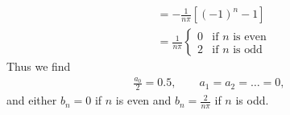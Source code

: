 \documentclass[11pt]{article}
\begin{document}
\begin{solution}
\begin{align*}
        &= 
        -
        \frac{1}{n\pi}
        \left[ (-1)^n - 1 \right] 
        \\
        &= 
        \frac{1}{n\pi}
        \begin{cases}
            0 & \text{if } n \text{ is even} 
            \\
            2 & \text{if } n \text{ is odd}
        \end{cases}
    \end{align*}
    Thus we find 
    \begin{align}
        \frac{a_0}{2} = 0.5,
        \qquad 
        a_1 = a_2 = \dots = 0,
    \end{align}
    and either $b_n = 0$ if $n$ is even and $b_n = \frac{2}{n\pi}$ if $n$ is odd. 
\end{solution}
\end{document}
